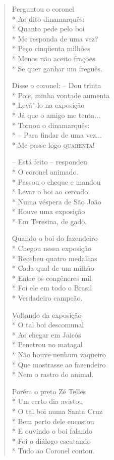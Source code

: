 \begin{verse}
Perguntou o coronel\\*
Ao dito dinamarquês:\\*
Quanto pede pelo boi\\*
Me responda de uma vez?\\*
Peço cinqüenta milhões\\*
Menos não aceito frações\\*
Se quer ganhar um freguês.

Disse o coronel: --  Dou trinta\\*
Pois, minha vontade aumenta\\*
Levá"-lo na exposição\\*
Já que o amigo me tenta...\\*
Tornou o dinamarquês:\\*
--  Para findar de uma vez...\\*
Me passe logo \textsc{quarenta}!

--  Está feito --  respondeu\\*
O coronel animado.\\*
Passou o cheque e mandou\\*
Levar o boi ao cercado.\\*
Numa véspera de São João\\*
Houve uma exposição\\*
Em Teresina, de gado.

Quando o boi do fazendeiro\\*
Chegou nessa exposição\\*
Recebeu quatro medalhas\\*
Cada qual de um milhão\\*
Entre os congêneres mil\\*
Foi ele em todo o Brasil\\*
Verdadeiro campeão.

Voltando da exposição\\*
O tal boi descomunal\\*
Ao chegar em Jaicós\\*
Penetrou no matagal\\*
Não houve nenhum vaqueiro\\*
Que mostrasse ao fazendeiro\\*
Nem o rastro do animal.

Porém o preto Zé Telles\\*
Um certo dia avistou\\*
O tal boi numa Santa Cruz\\*
Bem perto dele encostou\\*
E ouvindo o boi falando\\*
Foi o diálogo escutando\\*
Tudo ao Coronel contou.


\end{verse}
